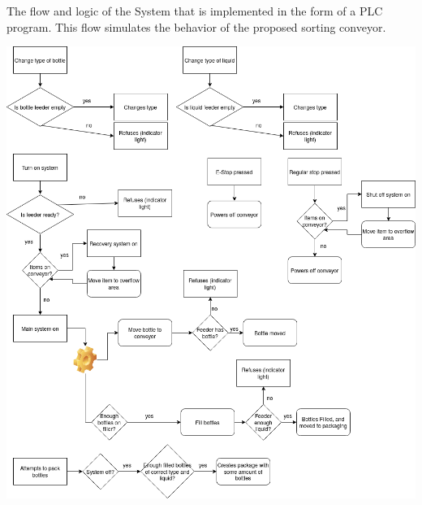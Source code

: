 The flow and logic of the System that is implemented in the form of a PLC program. This flow simulates the behavior of the proposed sorting conveyor.

\hspace{-3cm}\includegraphics[scale=0.6]{external/logic.png}